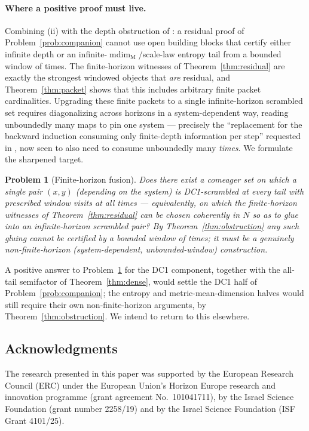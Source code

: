 \documentclass[11pt]{article}
\newtheorem{problem}[theorem]{Problem}
\newcommand{\mdim}{\operatorname{mdim}_{\mathrm M}}
\begin{document}
\paragraph{Where a positive proof must live.}
Combining (ii) with the depth obstruction of \cite[Theorem~6.2]{companion}: a residual
proof of Problem~\ref{prob:companion} cannot use open building blocks that certify
either infinite depth or an infinite-\(\mdim\)/scale-law entropy tail from a bounded
window of times.  The
finite-horizon witnesses of Theorem~\ref{thm:residual} are exactly the strongest
windowed objects that \emph{are} residual, and Theorem~\ref{thm:packet} shows that this
includes arbitrary finite packet cardinalities.  Upgrading these finite packets to a
single infinite-horizon scrambled set requires diagonalizing across horizons in a
system-dependent way, reading unboundedly many maps to pin one system --- precisely the
``replacement for the backward induction consuming only finite-depth information per
step'' requested in \cite{companion}, now seen to also need to consume unboundedly many
\emph{times}.  We formulate the sharpened target.

\begin{problem}[Finite-horizon fusion]\label{prob:fusion}
Does there exist a comeager set on which a \emph{single} pair $(x,y)$ (depending on the
system) is DC1-scrambled at every tail with prescribed window visits at all times ---
equivalently, on which the finite-horizon witnesses of Theorem~\ref{thm:residual} can be
chosen coherently in $N$ so as to glue into an infinite-horizon scrambled pair?  By
Theorem~\ref{thm:obstruction} any such gluing cannot be certified by a bounded window of
times; it must be a genuinely non-finite-horizon (system-dependent, unbounded-window)
construction.
\end{problem}

A positive answer to Problem~\ref{prob:fusion} for the DC1 component, together with the
all-tail semifactor of Theorem~\ref{thm:dense}, would settle the DC1 half of
Problem~\ref{prob:companion}; the entropy and metric-mean-dimension halves would still
require their own non-finite-horizon arguments, by Theorem~\ref{thm:obstruction}.  We
intend to return to this elsewhere.

\subsection*{Acknowledgments}
The research presented in this paper was supported by the European Research Council
(ERC) under the European Union's Horizon Europe research and innovation programme
(grant agreement No.\ 101041711), by the Israel Science Foundation (grant number
2258/19) and by the Israel Science Foundation (ISF Grant 4101/25).
\end{document}

